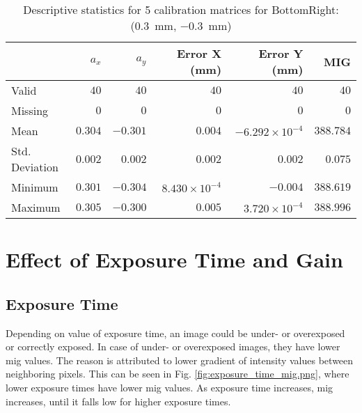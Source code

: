 \begin{table}[h]
    \begin{subtable}{\textwidth}
        \centering
        \footnotesize
        \begin{tabular}{lrrrrr}
            \toprule
                & $a_x$ & $a_y$ & Error X (mm) & Error Y (mm) & MIG  \\
            \midrule
			Valid & $40$ & $40$ & $40$ & $40$ & $40$  \\
			Missing & $0$ & $0$ & $0$ & $0$ & $0$  \\
			Mean & $0.304$ & $-0.301$ & $0.004$ & $-6.292\times10^{-4}$ & $388.784$  \\
			Std. Deviation & $0.002$ & $0.002$ & $0.002$ & $0.002$ & $0.075$  \\
			Minimum & $0.301$ & $-0.304$ & $8.430\times10^{-4}$ & $-0.004$ & $388.619$  \\
			Maximum & $0.305$ & $-0.300$ & $0.005$ & $3.720\times10^{-4}$ & $388.996$  \\
            \bottomrule
        \end{tabular}
        \caption{$T_{Avg}$}
        \end{subtable}

    \caption{Descriptive statistics for 5 calibration matrices for \textsf{BottomRight:} (\SI{0.3}{\milli\meter}, \SI{-0.3}{\milli\meter})}
    \label{table:stats_matrix_bottomright}
\end{table}

\clearpage
\section{Effect of Exposure Time and Gain} \label{section:effect_of_exp_time_gain}
\subsection*{Exposure Time}
Depending on value of exposure time, an image could be under- or overexposed or correctly exposed. In case of under- or overexposed images, they have lower \gls{mig} values. The reason is attributed to lower gradient of intensity values between neighboring pixels. This can be seen in Fig. \ref{fig:exposure_time_mig.png}, where lower exposure times have lower \gls{mig} values. As exposure time increases, \gls{mig} increases, until it falls low for higher exposure times.


